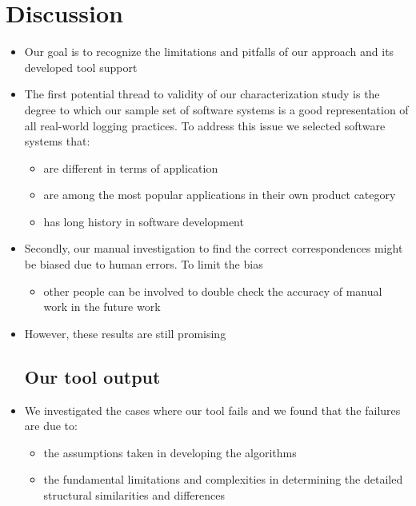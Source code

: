 \chapter{Discussion}  \label{diss}
\begin{itemize} [leftmargin=.01in]
\section{Threats to validity}  \label{threads}
\item Our goal is to recognize the limitations and pitfalls of our approach and its developed tool support
\item The first potential thread to validity of our characterization study is the degree to which our sample set of software systems is a good representation of all real-world logging practices. To address this issue we selected software systems that:
\begin{itemize} [leftmargin=.3in]
\item are different in terms of application
\item are among the most popular applications in their own product category
\item has long history in software development
\end{itemize}
\item Secondly, our manual investigation to find the correct correspondences might be biased due to human errors. To limit the bias
\begin{itemize} [leftmargin=.3in] 
\item other people can be involved to double check the accuracy of manual work in the future work
\end{itemize}
\item However, these results are still promising

\section{Our tool output}  \label{output}
\item We investigated the cases where our tool fails and we found that the failures are due to:
\begin{itemize} [leftmargin=.3in]
\item the assumptions taken in developing the algorithms
\item the fundamental limitations and complexities in determining the detailed structural similarities and differences
\end{itemize}


\end{itemize}
